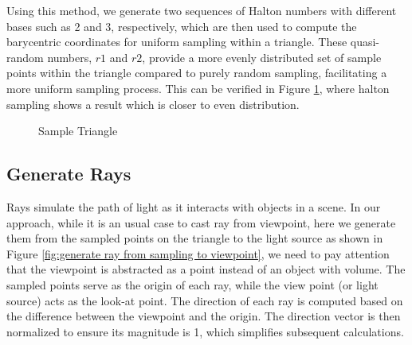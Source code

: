 \documentclass[11pt, a4paper,oneside,chapterprefix=false]{scrbook}
\begin{document}
Using this method, we generate two sequences of Halton numbers with different bases such as 2 and 3, respectively, which are then used to compute the barycentric coordinates for uniform sampling within a triangle. These quasi-random numbers, \( r1 \) and \( r2 \), provide a more evenly distributed set of sample points within the triangle compared to purely random sampling, facilitating a more uniform sampling process. This can be verified in Figure \ref{fig:sample triangle}, where halton sampling shows a result which is closer to even distribution.  

\begin{figure}[H]
    \centering
      \label{fig:uniform sampling} 
     \label{fig:halton sampling}
    \caption{Sample Triangle}
    \label{fig:sample triangle}
\end{figure}



\subsection{Generate Rays}

Rays simulate the path of light as it interacts with objects in a scene. In our approach, while it is an usual case to cast ray from viewpoint, here we generate them from the sampled points on the triangle to the light source as shown in Figure \ref{fig:generate ray from sampling to viewpoint}, we need to pay attention that the viewpoint is abstracted as a point instead of an object with volume. The sampled points serve as the origin of each ray, while the view point (or light source) acts as the look-at point. The direction of each ray is computed based on the difference between the viewpoint and the origin. The direction vector is then normalized to ensure its magnitude is 1, which simplifies subsequent calculations.
\end{document}
